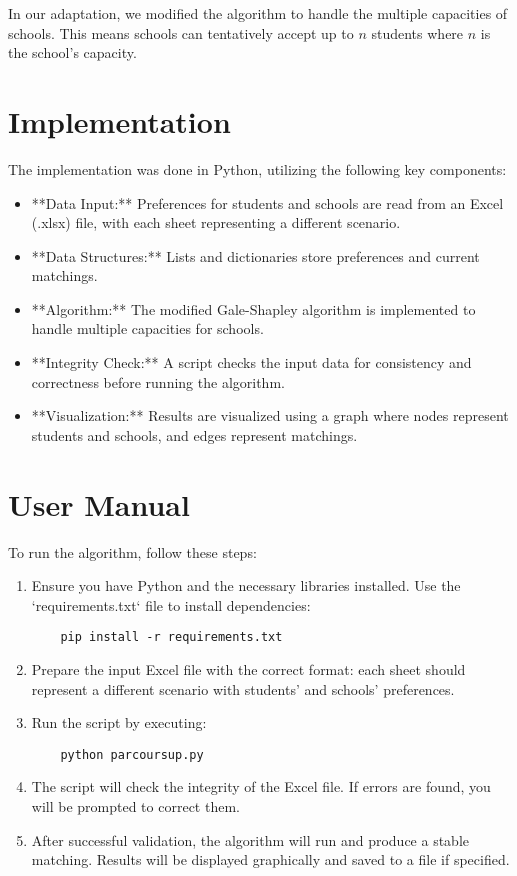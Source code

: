 \documentclass{article}
\begin{document}
In our adaptation, we modified the algorithm to handle the multiple capacities of schools. This means schools can tentatively accept up to \( n \) students where \( n \) is the school's capacity.

\section{Implementation}
The implementation was done in Python, utilizing the following key components:

\begin{itemize}
    \item **Data Input:** Preferences for students and schools are read from an Excel (.xlsx) file, with each sheet representing a different scenario.
    \item **Data Structures:** Lists and dictionaries store preferences and current matchings.
    \item **Algorithm:** The modified Gale-Shapley algorithm is implemented to handle multiple capacities for schools.
    \item **Integrity Check:** A script checks the input data for consistency and correctness before running the algorithm.
    \item **Visualization:** Results are visualized using a graph where nodes represent students and schools, and edges represent matchings.
\end{itemize}

\section{User Manual}
To run the algorithm, follow these steps:

\begin{enumerate}
    \item Ensure you have Python and the necessary libraries installed. Use the `requirements.txt` file to install dependencies:
    \begin{verbatim}
    pip install -r requirements.txt
    \end{verbatim}
    \item Prepare the input Excel file with the correct format: each sheet should represent a different scenario with students' and schools' preferences.
    \item Run the script by executing:
    \begin{verbatim}
    python parcoursup.py
    \end{verbatim}
    \item The script will check the integrity of the Excel file. If errors are found, you will be prompted to correct them.
    \item After successful validation, the algorithm will run and produce a stable matching. Results will be displayed graphically and saved to a file if specified.
\end{enumerate}
\end{document}
